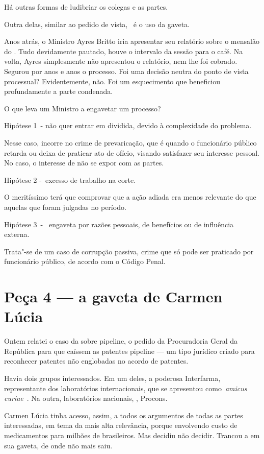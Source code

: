 Há outras formas de ludibriar os colegas e as partes.

Outra delas, similar ao pedido de vista, ~é o uso da gaveta.

Anos atrás, o Ministro Ayres Britto iria apresentar seu relatório sobre
o mensalão do . Tudo devidamente pautado, houve o intervalo da
sessão para o café. Na volta, Ayres simplesmente não apresentou o
relatório, nem lhe foi cobrado. Segurou por anos e anos o processo. Foi
uma decisão neutra do ponto de vista processual? Evidentemente, não. Foi
um esquecimento que beneficiou profundamente a parte condenada.

O que leva um Ministro a engavetar um processo?

Hipótese 1~- não quer entrar em dividida, devido à complexidade do
problema.

Nesse caso, incorre no crime de prevaricação, que é quando o funcionário
público retarda ou deixa de praticar ato de ofício, visando satisfazer
seu interesse pessoal. No caso, o interesse de não se expor com as
partes.

Hipótese 2 -~excesso de trabalho na corte.

O meritíssimo terá que comprovar que a ação adiada era menos relevante
do que aquelas que foram julgadas no período.

Hipótese 3~- ~engaveta por razões pessoais, de benefícios ou de
influência externa.

Trata"-se de um caso de corrupção passiva, crime que só pode ser
praticado por funcionário público, de acordo com o Código Penal.

\section{Peça 4 --- a gaveta de Carmen Lúcia}

Ontem relatei o caso da  sobre pipeline, o pedido da Procuradoria
Geral da República para que caíssem as patentes pipeline --- um tipo
jurídico criado para reconhecer patentes não englobadas no acordo de
patentes.

Havia dois grupos interessados. Em um deles, a poderosa Interfarma,
representante dos laboratórios internacionais, que se apresentou
como~\emph{amicus curiae}~. Na outra, laboratórios nacionais, ,
Procons.

Carmen Lúcia tinha acesso, assim, a todos os argumentos de todas as
partes interessadas, em tema da mais alta relevância, porque envolvendo
custo de medicamentos para milhões de brasileiros. Mas decidiu não
decidir. Trancou a  em sua gaveta, de onde não mais saiu.

